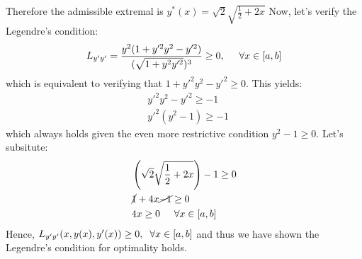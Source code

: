 Therefore the admissible extremal is $y^*(x) = \sqrt{2} \sqrt{\frac{1}{2} +2x} $
Now, let's verify the Legendre's condition:
\begin{equation}
        L_{y'y'} = \frac{y^2(1+ y'^2 y^2 - y'^2 )}{(\sqrt{1+y^2 y'^2})^3} \geq 0, \hspace{0.5cm} \forall x \in [a,b]
\end{equation}
which is equivalent to verifying that $1+ y'^2 y^2 - y'^2 \geq 0$. This yields:
\begin{align}
    &y'^2 y^2 - y'^2 \geq -1 \\
    &y'^2 (y^2 - 1) \geq -1
\end{align}
which always holds given the even more restrictive condition $y^2 - 1 \geq 0$. Let's subsitute:
\begin{align}
    &\left( \sqrt{2} \sqrt{\frac{1}{2} +2x} \right) - 1 \geq 0 \\
    &\cancel{1} + 4x \cancel{-1} \geq 0 \\
    &4x \geq 0 \hspace{0.5cm} \forall x \in [a,b]
\end{align}
Hence, $L_{y'y'}(x, y(x), y'(x)) \geq 0, \hspace{0.2cm} \forall x \in [a, b]$ and thus we have shown the Legendre's condition for optimality holds.
\QEDB


